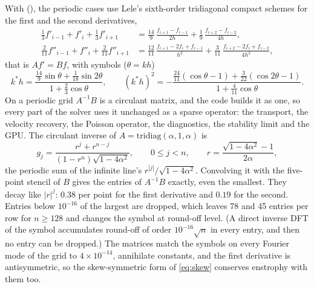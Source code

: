 \documentclass[11pt,a4paper]{article}
\newcommand{\code}[1]{\texttt{\detokenize{#1}}}
\begin{document}
With \code{--order compact6} (\code{FD_COMPACT6}), the periodic cases use Lele's sixth-order tridiagonal compact schemes \cite{lele1992} for the first and the second derivatives,
\begin{align}
\tfrac13 f'_{i-1}+f'_i+\tfrac13 f'_{i+1}&=\tfrac{14}{9}\,\frac{f_{i+1}-f_{i-1}}{2h}+\tfrac19\,\frac{f_{i+2}-f_{i-2}}{4h},\\
\tfrac{2}{11} f''_{i-1}+f''_i+\tfrac{2}{11} f''_{i+1}&=\tfrac{12}{11}\,\frac{f_{i+1}-2f_i+f_{i-1}}{h^2}+\tfrac{3}{11}\,\frac{f_{i+2}-2f_i+f_{i-2}}{4h^2},
\end{align}
that is $Af'=Bf$, with symbols ($\theta=kh$)
\begin{equation}
k^*h=\frac{\tfrac{14}{9}\sin\theta+\tfrac1{18}\sin2\theta}{1+\tfrac23\cos\theta},\qquad
(k^*h)^2=-\frac{\tfrac{24}{11}(\cos\theta-1)+\tfrac{3}{22}(\cos2\theta-1)}{1+\tfrac{4}{11}\cos\theta}.
\end{equation}
On a periodic grid $A^{-1}B$ is a circulant matrix, and the code builds it as one, so every part of the solver uses it unchanged as a sparse operator: the transport, the velocity recovery, the Poisson operator, the diagnostics, the stability limit and the GPU.  The circulant inverse of $A=\mathrm{tridiag}(\alpha,1,\alpha)$ is
\begin{equation}
g_j=\frac{r^j+r^{n-j}}{(1-r^n)\sqrt{1-4\alpha^2}},\qquad 0\le j<n,\qquad r=\frac{\sqrt{1-4\alpha^2}-1}{2\alpha},
\end{equation}
the periodic sum of the infinite line's $r^{|j|}/\sqrt{1-4\alpha^2}$.  Convolving it with the five-point stencil of $B$ gives the entries of $A^{-1}B$ exactly, even the smallest.  They decay like $|r|^j$: $0.38$ per point for the first derivative and $0.19$ for the second.  Entries below $10^{-16}$ of the largest are dropped, which leaves 78 and 45 entries per row for $n\ge128$ and changes the symbol at round-off level.  (A direct inverse DFT of the symbol accumulates round-off of order $10^{-16}\sqrt n$ in every entry, and then no entry can be dropped.)  The matrices match the symbols on every Fourier mode of the grid to $4\times10^{-14}$, annihilate constants, and the first derivative is antisymmetric, so the skew-symmetric form of \cref{eq:skew} conserves enstrophy with them too.
\end{document}
